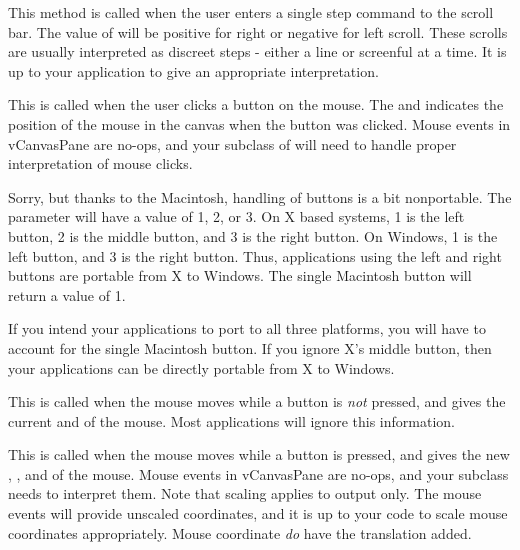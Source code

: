 
This method is called when the user enters a single step command
to the scroll bar. The value of  will be positive for right or
negative for left scroll.  These scrolls
are usually interpreted as discreet steps - either a line or
screenful at a time. It is up to your application to give
an appropriate interpretation.


This is called when the user clicks a button on the mouse. The
 and  indicates the position of the mouse in the
canvas when the button was clicked. Mouse events in vCanvasPane
are no-ops, and your subclass of  will need to
handle proper interpretation of mouse clicks.

Sorry, but thanks to the Macintosh, handling of buttons is a bit
nonportable. The  parameter will have a value of 1,
2, or 3. On X based systems, 1 is the left button, 2 is the
middle button, and 3 is the right button. On Windows, 1 is the
left button, and 3 is the right button. Thus, applications using
the left and right buttons are portable from X to Windows. The
single Macintosh button will return a value of 1. 

If you intend your applications to port to all three platforms,
you will have to account for the single Macintosh button. If you
ignore X's middle button, then your applications can be directly
portable from X to Windows.


This is called when the mouse moves while a button is \emph{not}
pressed, and gives the current  and  of the
mouse. Most applications will ignore this information.


This is called when the mouse moves while a button is pressed,
and gives the new , , and  of the
mouse. Mouse events in vCanvasPane are no-ops, and your subclass
needs to interpret them.
Note that scaling applies to output only. The mouse
events will provide unscaled coordinates, and it is up
to your code to scale mouse coordinates appropriately.
Mouse coordinate \emph{do} have the translation added.

